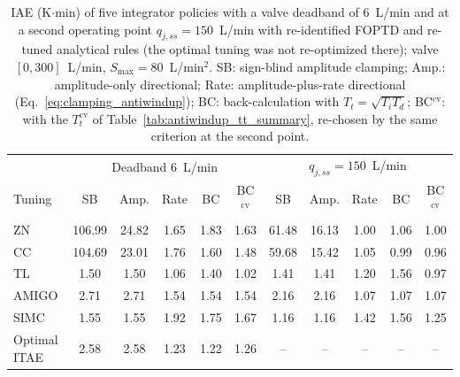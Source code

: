 \begin{table}[t]
\centering
\footnotesize
\caption{IAE (K$\cdot$min) of five integrator policies with a valve deadband of $6$~L/min and at a second operating point $q_{j,ss} = 150$~L/min with re-identified FOPTD and re-tuned analytical rules (the optimal tuning was not re-optimized there); valve $[0, 300]$~L/min, $S_{\max} = 80$~L/min$^2$. SB: sign-blind amplitude clamping; Amp.: amplitude-only directional; Rate: amplitude-plus-rate directional (Eq.~\eqref{eq:clamping_antiwindup}); BC: back-calculation with $T_t = \sqrt{T_iT_d}$; BC$^{\mathrm{cv}}$: with the $T_t^{\mathrm{cv}}$ of Table~\ref{tab:antiwindup_tt_summary}, re-chosen by the same criterion at the second point.}
\label{tab:robustness_ext}
\begin{tabular}{lcccccccccc}
\toprule
 & \multicolumn{5}{c}{Deadband $6$~L/min} & \multicolumn{5}{c}{$q_{j,ss} = 150$~L/min} \\
Tuning & SB & Amp. & Rate & BC & BC$^{\mathrm{cv}}$ & SB & Amp. & Rate & BC & BC$^{\mathrm{cv}}$ \\
\midrule
ZN & 106.99 & 24.82 & 1.65 & 1.83 & 1.63 & 61.48 & 16.13 & 1.00 & 1.06 & 1.00 \\
CC & 104.69 & 23.01 & 1.76 & 1.60 & 1.48 & 59.68 & 15.42 & 1.05 & 0.99 & 0.96 \\
TL & 1.50 & 1.50 & 1.06 & 1.40 & 1.02 & 1.41 & 1.41 & 1.20 & 1.56 & 0.97 \\
AMIGO & 2.71 & 2.71 & 1.54 & 1.54 & 1.54 & 2.16 & 2.16 & 1.07 & 1.07 & 1.07 \\
SIMC & 1.55 & 1.55 & 1.92 & 1.75 & 1.67 & 1.16 & 1.16 & 1.42 & 1.56 & 1.25 \\
Optimal ITAE & 2.58 & 2.58 & 1.23 & 1.22 & 1.26 & -- & -- & -- & -- & -- \\
\bottomrule
\end{tabular}
\end{table}
